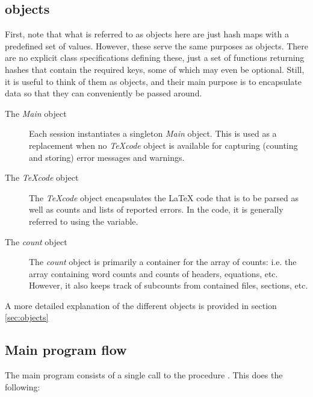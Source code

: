 \documentclass{article}
\newcommand\Obj[1]{\textsl{#1}}
\begin{document}
\subsection{\TeXcount{} objects}

First, note that what is referred to as objects here are just hash maps with a predefined set of values. However, these serve the same purposes as objects. There are no explicit class specifications defining these, just a set of functions returning hashes that contain the required keys, some of which may even be optional. Still, it is useful to think of them as objects, and their main purpose is to encapsulate data so that they can conveniently be passed around.

\begin{description}

\item[The \Obj{Main} object]
Each \TeXcount{} session instantiates a singleton \Obj{Main} object. This is used as a replacement when no \Obj{TeXcode} object is available for capturing (counting and storing) error messages and warnings.

\item[The \Obj{TeXcode} object]
The \Obj{TeXcode} object encapsulates the \LaTeX{} code that is to be parsed as well as counts and lists of reported errors. In the code, it is generally referred to using the  variable.

\item[The \Obj{count} object]
The \Obj{count} object is primarily a container for the array of counts: i.e. the array containing word counts and counts of headers, equations, etc. However, it also keeps track of subcounts from contained files, sections, etc.

\end{description}

A more detailed explanation of the different objects is provided in section \ref{sec:objects}


\subsection{Main program flow}

The main program consists of a single call to the procedure . This does the following:
\end{document}
